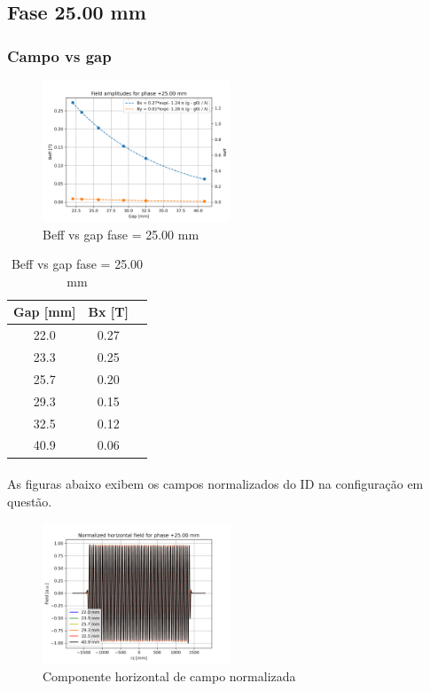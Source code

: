 \documentclass[a4paper,12pt]{article}
\begin{document}
\subsection{Fase 25.00 mm}

\subsubsection{Campo vs gap}
\begin{figure}[H]
\hspace{4cm}
\includegraphics[width=0.5\textwidth]{figs/phase25 B vs gap.png}
\caption{Beff vs gap fase = 25.00 mm}
\label{fig:fiedlgap25}
\end{figure}

\begin{table}[H]
\caption{Beff vs gap fase = 25.00 mm}
\centering
\begin{tabular}{|c|c|c|}
\hline
   Gap [mm] &   Bx [T]  \\
\hline
       22.0   &     0.27       \\
       23.3 &     0.25       \\
       25.7 &     0.20       \\
       29.3 &     0.15       \\
       32.5 &     0.12         \\
       40.9 &     0.06          \\
\hline
\end{tabular}
\end{table}

\paragraph{} As figuras abaixo exibem os campos normalizados do ID na configuração em questão.


\begin{figure}[H]
\begin{center}
\includegraphics[width=0.5\textwidth]{figs/phase25 Bx.png}
\caption{Componente horizontal de campo normalizada}
\label{fig:bx_25}
\end{center}
\end{figure}
\end{document}

